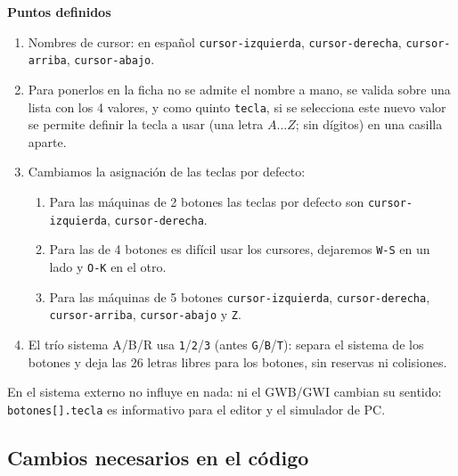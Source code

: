 \textbf{Puntos definidos}
\begin{enumerate}
	\item Nombres de cursor: en español \texttt{cursor-izquierda}, \texttt{cursor-derecha}, \texttt{cursor-arriba},  \texttt{cursor-abajo}.
	
	\item Para ponerlos en la ficha no se admite el nombre a mano, se valida sobre una lista con los 4 valores, y como quinto \texttt{tecla}, si se selecciona este nuevo valor se permite definir la tecla a usar (una letra $A \dots Z$; sin dígitos) en una casilla aparte. 
	
	\item Cambiamos la asignación de las teclas por defecto:
	\begin{enumerate}
		\item Para las máquinas de 2 botones las teclas por defecto son \texttt{cursor-izquierda}, \texttt{cursor-derecha}. 
			
		\item Para las de 4 botones es difícil usar los cursores, dejaremos \texttt{W-S} en un lado y \texttt{O-K} en el otro.
		
		\item Para las máquinas de 5 botones \texttt{cursor-izquierda}, \texttt{cursor-derecha}, \texttt{cursor-arriba}, \texttt{cursor-abajo} y \texttt{Z}.
	\end{enumerate}
	
	\item El trío sistema A/B/R usa \texttt{1}/\texttt{2}/\texttt{3} (antes \texttt{G}/\texttt{B}/\texttt{T}): separa el sistema de los botones y deja las 26 letras libres para los botones, sin reservas ni colisiones.
\end{enumerate}

En el sistema externo no influye en nada: ni el GWB/GWI cambian su sentido: \texttt{botones[].tecla} es informativo para el editor y el simulador de PC.

\subsection{Cambios necesarios en el código}
\label{sec:F5I17Codigo}

